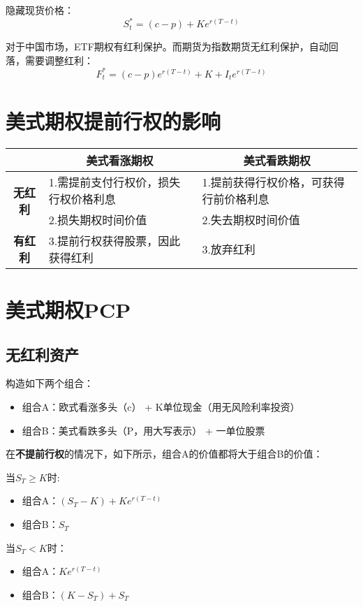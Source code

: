 \documentclass[11pt]{article}
\begin{document}
隐藏现货价格：
\begin{equation*}
    S^*_t = (c-p) + K e^{r(T-t)}
\end{equation*}

对于中国市场，ETF期权有红利保护。而期货为指数期货无红利保护，自动回落，需要调整红利：
\begin{equation*}
    F^*_t = (c-p)e^{r(T-t)} + K + I_t e^{r(T-t)}
\end{equation*}

\section{美式期权提前行权的影响}
\begin{table}[H]
\centering
\begin{tabular}{@{}cll@{}}
\toprule
\multicolumn{1}{l}{}
& \multicolumn{1}{c}{\textbf{美式看涨期权}} & \multicolumn{1}{c}{\textbf{美式看跌期权}} \\
\midrule
\multirow{2}{*}{\textbf{无红利}} 
& 1.需提前支付行权价，损失行权价格利息 & 1.提前获得行权价格，可获得行前价格利息 \\
& 2.损失期权时间价值 & 2.失去期权时间价值 \\
\textbf{有红利} & 3.提前行权获得股票，因此获得红利 & 3.放弃红利 \\
\bottomrule
\end{tabular}
\end{table}

\section{美式期权PCP}
\subsection{无红利资产}
构造如下两个组合：
\begin{itemize}
\setlength{\itemindent}{2em}
    \item 组合A：欧式看涨多头（c） + K单位现金（用无风险利率投资）
    \item 组合B：美式看跌多头（P，用大写表示） + 一单位股票
\end{itemize}

在\textbf{不提前行权}的情况下，如下所示，组合A的价值都将大于组合B的价值：
\begin{multicols}{2}
当$S_T \geq K$时:
\begin{itemize}
\setlength{\itemindent}{2em}
    \item 组合A：$(S_T-K) + Ke^{r(T-t)}$
    \item 组合B：$S_T$
\end{itemize}
\vfill\columnbreak
当$S_T < K$时：
\begin{itemize}
    \item 组合A：$Ke^{r(T-t)}$
    \item 组合B：$(K - S_T) + S_T$
\end{itemize}
\end{multicols}
\end{document}
